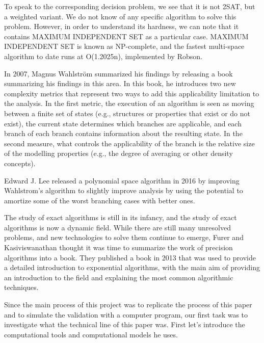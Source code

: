 \documentclass{sigchi}
\begin{document}
To speak to the corresponding decision problem, we see that it is not 2SAT, but a weighted variant. We do not know of any specific algorithm to solve this problem. However, in order to understand its hardness, we can note that it contains MAXIMUM INDEPENDENT SET as a particular case. MAXIMUM INDEPENDENT SET is known as NP-complete, and the fastest multi-space algorithm to date runs at O(1.2025n), implemented by Robson.\cite{robson2001finding}

In 2007, Magnus Wahlström summarized his findings by releasing a book summarizing his findings in this area.\cite{Wahlstrom} In this book, he introduces two new complexity metrics that represent two ways to add this applicability limitation to the analysis. In the first metric, the execution of an algorithm is seen as moving between a finite set of states (e.g., structures or properties that exist or do not exist), the current state determines which branches are applicable, and each branch of each branch contains information about the resulting state. In the second measure, what controls the applicability of the branch is the relative size of the modelling properties (e.g., the degree of averaging or other density concepts).

Edward J. Lee released a polynomial space algorithm in 2016 by improving Wahlstrom's algorithm to slightly improve analysis by using the potential to amortize some of the worst branching cases with better ones. \cite{Lee}

The study of exact algorithms is still in its infancy, and the study of exact algorithms is now a dynamic field. While there are still many unresolved problems, and new technologies to solve them continue to emerge, Furer and Kasiviswanathan thought it was time to summarize the work of precision algorithms into a book. They published a book in 2013 that was used to provide a detailed introduction to exponential algorithms, with the main aim of providing an introduction to the field and explaining the most common algorithmic techniques.\cite{10.1145/2428556.2428575}

Since the main process of this project was to replicate the process of this paper and to simulate the validation with a computer program, our first task was to investigate what the technical line of this paper was. First let's introduce the computational tools and computational models he uses.
\end{document}
